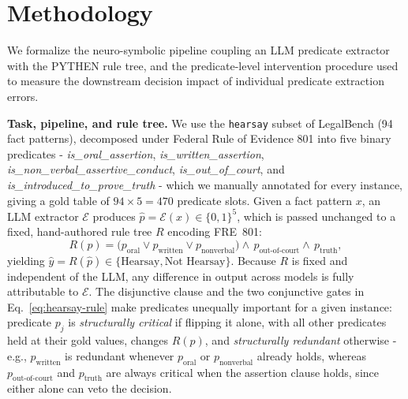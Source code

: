 \section{Methodology}
\label{sec:method}

We formalize the neuro-symbolic pipeline coupling an LLM predicate extractor with the PYTHEN rule tree, and the predicate-level intervention procedure used to measure the downstream decision impact of individual predicate extraction errors.

\textbf{Task, pipeline, and rule tree.}
We use the \texttt{hearsay} subset of LegalBench (94 fact patterns), decomposed under Federal Rule of Evidence 801 into five binary predicates - \textit{is\_oral\_assertion}, \textit{is\_written\_assertion}, \textit{is\_non\_verbal\_assertive\_conduct}, \textit{is\_out\_of\_court}, and \textit{is\_introduced\_to\_prove\_truth} - which we manually annotated for every instance, giving a gold table of $94\times5=470$ predicate slots. Given a fact pattern $x$, an LLM extractor $\mathcal{E}$ produces $\hat{p} = \mathcal{E}(x) \in \{0,1\}^5$, which is passed unchanged to a fixed, hand-authored rule tree $R$ encoding FRE~801:
\begin{equation}
\label{eq:hearsay-rule}
R(p) = \big(p_{\text{oral}} \lor p_{\text{written}} \lor p_{\text{nonverbal}}\big) \land\, p_{\text{out-of-court}} \land\, p_{\text{truth}},
\end{equation}
yielding $\hat{y} = R(\hat{p}) \in \{\text{Hearsay}, \text{Not Hearsay}\}$. Because $R$ is fixed and independent of the LLM, any difference in output across models is fully attributable to $\mathcal{E}$. The disjunctive clause and the two conjunctive gates in Eq.~\ref{eq:hearsay-rule} make predicates unequally important for a given instance: predicate $p_j$ is \emph{structurally critical} if flipping it alone, with all other predicates held at their gold values, changes $R(p)$, and \emph{structurally redundant} otherwise - e.g., $p_{\text{written}}$ is redundant whenever $p_{\text{oral}}$ or $p_{\text{nonverbal}}$ already holds, whereas $p_{\text{out-of-court}}$ and $p_{\text{truth}}$ are always critical when the assertion clause holds, since either alone can veto the decision.

